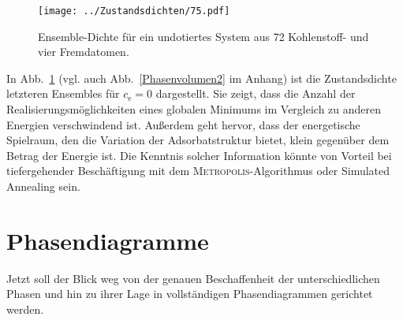 \documentclass[a4paper, 10pt, twoside, openany]{book} %
\def \cE {c_\mathrm{e}}
\begin{document}
	\begin{figure}
		\texttt{[image: ../Zustandsdichten/75.pdf]}
		\caption[Ensemble-Dichte ohne Dotierung]{Ensemble-Dichte für ein undotiertes System aus 72 Kohlenstoff- und vier Fremdatomen.}
		\label{Phasenvolumen}
	\end{figure}
	In Abb.~\ref{Phasenvolumen} (vgl. auch Abb.~\ref{Phasenvolumen2} im Anhang) ist die Zustandsdichte letzteren Ensembles für $\cE = 0$ dargestellt. Sie zeigt, dass die Anzahl der Realisierungsmöglichkeiten eines globalen Minimums im Vergleich zu anderen Energien verschwindend ist. Außerdem geht hervor, dass der energetische Spielraum, den die Variation der Adsorbatstruktur bietet, klein gegenüber dem Betrag der Energie ist. Die Kenntnis solcher Information könnte von Vorteil bei tiefergehender Beschäftigung mit dem \textsc{Metropolis}-Algorithmus oder Simulated Annealing sein.
	
	\section{Phasendiagramme}
	\label{Phasendiagramme}
	
	Jetzt soll der Blick weg von der genauen Beschaffenheit der unterschiedlichen Phasen und hin zu ihrer Lage in vollständigen Phasendiagrammen gerichtet werden.
	
\end{document}

